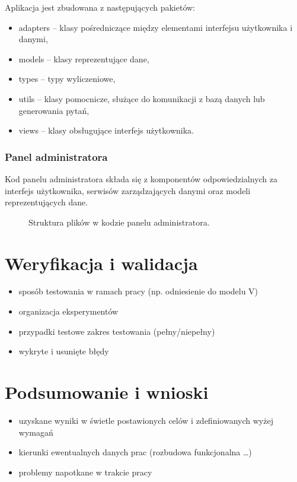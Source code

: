 \documentclass[a4paper,twoside,12pt]{book}
\begin{document}
Aplikacja jest zbudowana z następujących pakietów:
\begin{itemize}
\item adapters -- klasy pośredniczące między elementami interfejsu użytkownika i danymi,
\item models -- klasy reprezentujące dane,
\item types -- typy wyliczeniowe,
\item utils -- klasy pomocnicze, służące do komunikacji z bazą danych lub generowania pytań,
\item views -- klasy obsługujące interfejs użytkownika.
\end{itemize}


\subsection{Panel administratora}

Kod panelu administratora składa się z komponentów odpowiedzialnych za interfejs użytkownika, serwisów zarządzających danymi oraz modeli reprezentujących dane.

\begin{figure}
\caption{Struktura plików w kodzie panelu administratora.}
\label{fig:dirtree}
\end{figure}


\chapter{Weryfikacja i walidacja}
\label{ch:06}
\begin{itemize}
\item sposób testowania w ramach pracy (np. odniesienie do modelu V)
\item organizacja eksperymentów
\item przypadki testowe zakres testowania (pełny/niepełny)
\item wykryte i usunięte błędy
\end{itemize}

\chapter{Podsumowanie i wnioski}
\begin{itemize}
\item uzyskane wyniki w świetle postawionych celów i zdefiniowanych wyżej wymagań
\item kierunki ewentualnych danych prac (rozbudowa funkcjonalna …)
\item problemy napotkane w trakcie pracy
\end{itemize}
\end{document}
